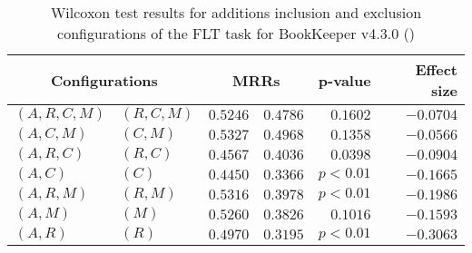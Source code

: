 
\begin{table}
\begin{spacing}{1.2}
\centering
\caption{Wilcoxon test results for additions inclusion and exclusion configurations of the FLT task for BookKeeper v4.3.0 (\ctwo)}
\label{table:versus-wilcox-bookkeeper-flt-additions}
\begin{tabular}{ll|rr|rr}
\toprule
      \multicolumn{2}{c|}{Configurations} &                \multicolumn{2}{c|}{MRRs} &        p-value & Effect size \\
\midrule
 $(A,R,C,M)$ &  $(R,C,M)$ &  $\bm{0.5246}$ &  $0.4786$ & $0.1602$ &   $-0.0704$ \\
   $(A,C,M)$ &    $(C,M)$ &  $\bm{0.5327}$ &  $0.4968$ & $0.1358$ &   $-0.0566$ \\
   $(A,R,C)$ &    $(R,C)$ &  $\bm{0.4567}$ &  $0.4036$ & $0.0398$ &   $-0.0904$ \\
     $(A,C)$ &      $(C)$ &  $\bm{0.4450}$ &  $0.3366$ & $p<0.01$ &   $-0.1665$ \\
   $(A,R,M)$ &    $(R,M)$ &  $\bm{0.5316}$ &  $0.3978$ & $p<0.01$ &   $-0.1986$ \\
     $(A,M)$ &      $(M)$ &  $\bm{0.5260}$ &  $0.3826$ & $0.1016$ &   $-0.1593$ \\
     $(A,R)$ &      $(R)$ &  $\bm{0.4970}$ &  $0.3195$ & $p<0.01$ &   $-0.3063$ \\
\bottomrule
\end{tabular}

\end{spacing}
\end{table}

